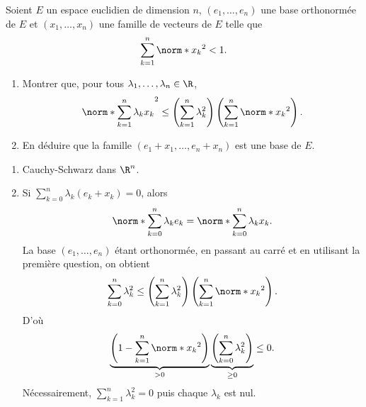 \begin{enonce}
\begin{exercise}[ID={RMS132 E1147},subtitle={Oral CCINP PSI 2021},tags={mpsi},difficulty{}, difficulty={0}]
  Soient $E$ un espace euclidien de dimension $n$, $\left( e_1,\dots,e_n \right)$ une base orthonormée de $E$ et $\left( x_1,\dots,x_n \right)$ une famille de vecteurs de $E$ telle que
  \begin{equation*}
    \sum_{k=1}^n \norm*{x_k}^2 < 1.
  \end{equation*}
  \begin{enumerate}
    \item Montrer que, pour tous $\lambda_1,\dots, \lambda_n \in\R$,
      \begin{equation*}
        \norm*{\sum_{k=1}^n \lambda_k x_k}^2
        \leq
        \left( \sum_{k=1}^n \lambda_k^2 \right) \left( \sum_{k=1}^n \norm*{x_k}^2 \right).
      \end{equation*}

    \item En déduire que la famille $\left( e_1+x_1, \dots, e_n + x_n \right)$ est une base de $E$.
  \end{enumerate}
\end{exercise}
\begin{solution}
  \begin{enumerate}
    \item Cauchy-Schwarz dans $\R^n$.

    \item Si $\sum_{k=0}^n \lambda_k (e_k + x_k) = 0$, alors
      \begin{equation*}
        \norm*{\sum_{k=0}^n \lambda_k e_k} = \norm*{\sum_{k=0}^n \lambda_k x_k}.
      \end{equation*}
      La base $(e_1,\dots,e_n)$ étant orthonormée, en passant au carré et en utilisant la première question, on obtient
      \begin{equation*}
        \sum_{k=0}^n \lambda_k^2 
        \leq
        \left( \sum_{k=1}^n \lambda_k^2 \right) \left( \sum_{k=1}^n \norm*{x_k}^2 \right).
      \end{equation*}
      D'où
      \begin{equation*}
        \underbrace{\left(1-\sum_{k=1}^n\norm*{x_k}^2\right)}_{>0} \underbrace{\left(\sum_{k=0}^n \lambda_k^2\right)}_{\geq 0} \leq 0.
      \end{equation*}
      Nécessairement, $\sum_{k=1}^n \lambda_k^2 = 0$ puis chaque $\lambda_k$ est nul.
  \end{enumerate}
\end{solution}
\end{enonce}
